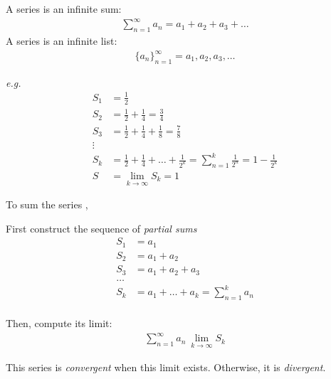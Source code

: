 \documentclass[../13.tex]{subfiles}
\begin{document}
A series is an infinite sum: \begin{align*}
    \sum_{n = 1}^{\infty} a_n = a_1 + a_2 + a_3 + \dots
\end{align*}
A series is an infinite list: \begin{align*}
    \{ a_n \}_{n=1}^\infty = a_1, a_2, a_3, \dots
\end{align*}

\emph{e.g.} 
\begin{align*}
    S_1 & = \frac{1}{2}                                                                                            \\
    S_2 & = \frac{1}{2} + \frac{1}{4} = \frac{3}{4}                                                                \\
    S_3 & = \frac{1}{2} + \frac{1}{4} + \frac{1}{8} = \frac{7}{8}                                                  \\
    \vdots                                                                                                         \\
    S_k & = \frac{1}{2} + \frac{1}{4} + \dots + \frac{1}{2^k} = \sum_{n = 1}^{k} \frac{1}{2^n} = 1 - \frac{1}{2^k} \\
    S   & =\lim_{k\to\infty} S_k = 1
\end{align*}

To sum the series , \begin{itemize}
    \begin{multicols}{2}

        \item First construct the sequence of \emph{partial sums}  \begin{align*}
            {S}_{1} & = {a}_{1}                                               \\
            {S}_{2} & = {a}_{1} + {a}_{2}                                     \\
            {S}_{3} & = {a}_{1} + {a}_{2} + {a}_{3}                           \\
            \dots                                                             \\
            {S}_{k} & = {a}_{1} +  \dots + {a}_{k} = \sum_{n = 1}^{k} {a}_{n} \\
        \end{align*}
        \item Then, compute its limit: \begin{align*}
            \sum_{n = 1}^{\infty} a_n \ \lim_{k\to\infty} S_k
        \end{align*}
    \end{multicols}
\end{itemize}
This series is \emph{convergent} when this limit exists. Otherwise, it is \emph{divergent}.
\newpage
\end{document}

